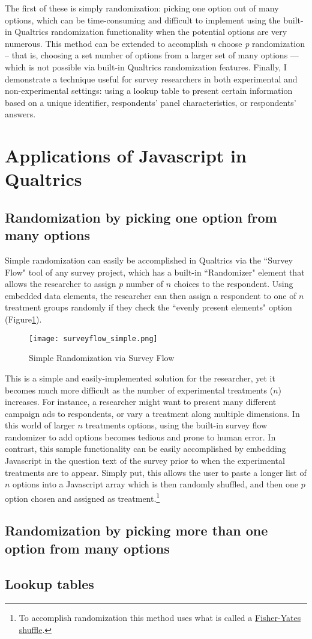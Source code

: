 \documentclass[12pt]{article}
\begin{document}
The first of these is simply randomization: picking one option out of many options, which can be time-consuming and difficult to implement using the built-in Qualtrics randomization functionality when the potential options are very numerous. This method can be extended to accomplish \emph{n} choose \emph{p} randomization -- that is, choosing a set number of options from a larger set of many options --- which is not possible via built-in Qualtrics randomization features. Finally, I demonstrate a technique useful for survey researchers in both experimental and non-experimental settings: using a lookup table to present certain information based on a unique identifier, respondents' panel characteristics, or respondents' answers.

\section{Applications of Javascript in Qualtrics}

\subsection{Randomization by picking one option from many options}
Simple randomization can easily be accomplished in Qualtrics via the ``Survey Flow" tool of any survey project, which has a built-in ``Randomizer" element that allows the researcher to assign $p$ number of $n$ choices to the respondent. Using embedded data elements, the researcher can then assign a respondent to one of $n$ treatment groups randomly if they check the ``evenly present elements" option (Figure\ref{fig:surveyflow_simple}).

\begin{figure}[!h] \centering 
 \caption{Simple Randomization via Survey Flow} 
\texttt{[image: surveyflow\_simple.png]}
  \label{fig:surveyflow_simple} 
  \end{figure} 

This is a simple and easily-implemented solution for the researcher, yet it becomes much more difficult as the number of experimental treatments ($n$) increases. For instance, a researcher might want to present many different campaign ads to respondents, or vary a treatment along multiple dimensions. In this world of larger $n$ treatments options, using the built-in survey flow randomizer to add options becomes tedious and prone to human error. In contrast, this sample functionality can be easily accomplished by embedding Javascript in the question text of the survey prior to when the experimental treatments are to appear. Simply put, this allows the user to paste a longer list of $n$ options into a Javascript array which is then randomly shuffled, and then one $p$ option chosen and assigned as treatment.\footnote{To accomplish randomization this method uses what is called a \href{https://en.wikipedia.org/wiki/Fisher\%E2\%80\%93Yates\_shuffle}{Fisher-Yates shuffle}.}

\subsection{Randomization by picking more than one option from many options}

\subsection{Lookup tables}



\end{document}
